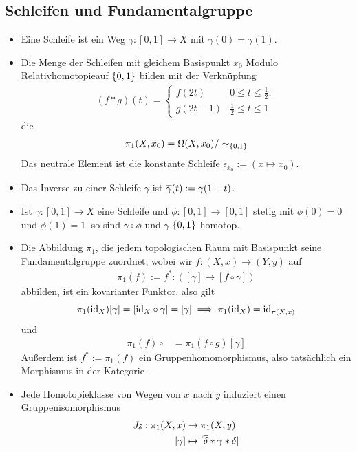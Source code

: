 \documentclass[8pt]{extarticle}
\begin{document}
\subsection*{Schleifen und Fundamentalgruppe}
\begin{itemize}
	\item Eine Schleife ist ein Weg $\gamma : [0,1] \to X$ mit $\gamma(0) = \gamma(1)$.
	\item Die Menge der Schleifen mit gleichem Basispunkt $x_0$ Modulo Relativhomotopieauf $\qty{0,1}$ bilden mit der Verknüpfung
	\begin{align*}
		(f * g)(t) = \begin{cases}
			f(2t) & 0 \leq t \leq \frac{1}{2};\\
			g(2t-1) & \frac{1}{2} \leq t \leq 1
		\end{cases}
	\end{align*}
	die 
	\begin{align*}
		\pi_1(X,x_0) = \Omega(X,x_0) / \sim_{\qty{0,1}}
	\end{align*}
	Das neutrale Element ist die konstante Schleife $\epsilon_{x_0} := (x \mapsto x_0)$.
	\item Das Inverse zu einer Schleife $\gamma$ ist $\overline{{\gamma}}(t) := \gamma(1-t)$.
	\item Ist $\gamma : [0,1] \to X$ eine Schleife und $\phi : [0,1] \to [0,1]$ stetig mit $\phi(0) = 0$ und $\phi(1) = 1$, so sind $\gamma \circ \phi$ und $\gamma$ $\qty{0,1}$-homotop.
	\item Die Abbildung $\pi_1$, die jedem topologischen Raum mit Basispunkt seine Fundamentalgruppe zuordnet, wobei wir $f : (X,x) \to (Y,y)$ auf
	\begin{align*}
		\pi_1(f) := f^* : ([\gamma] \mapsto [f \circ \gamma])
	\end{align*}
	abbilden, ist ein kovarianter Funktor, also gilt $$\pi_1(\textnormal{id}_X)[\gamma] = [\textnormal{id}_X \circ \gamma] = [\gamma] \implies \pi_1(\textnormal{id}_X) = \textnormal{id}_{\pi(X,x)}$$
	und
	\begin{align*}
		\pi_1(f) \circ &=
		\pi_1(f \circ g)[\gamma]
	\end{align*}
	Außerdem ist $f^* := \pi_1(f)$ ein Gruppenhomomorphismus, also tatsächlich ein Morphismus in der Kategorie .
	\item Jede Homotopieklasse von Wegen von $x$ nach $y$ induziert einen Gruppenisomorphismus
	\begin{align*}
		J_\delta : \pi_1(X,x) &\to \pi_1(X,y)\\
		[\gamma] &\mapsto [\ol \delta * \gamma * \delta]

\end{align*}
\end{itemize}
\end{document}
